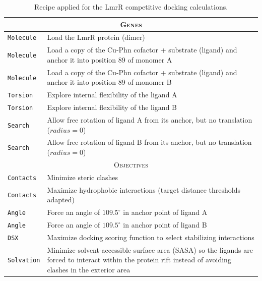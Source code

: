 \begin{table}[hbtp]
	\caption[Recipe applied for the LmrR competitive docking calculations]{Recipe applied for the LmrR competitive docking calculations.}
	\label{table:phn-recipe}
	\footnotesize
	\newcommand{\tableheading}[1]{\multicolumn{2}{c}{\textsc{#1}}}
	\begin{tabularx}{\textwidth}{RL}
		\toprule
		\tableheading{Genes}\\
		\toprule
		\texttt{Molecule} & Load the LmrR protein (dimer) \\
		\midrule
		\texttt{Molecule} & Load a copy of the Cu-Phn cofactor + substrate (ligand) and anchor it into position 89 of monomer A \\
		\midrule
		\texttt{Molecule} & Load a copy of the Cu-Phn cofactor + substrate (ligand) and anchor it into position 89 of monomer B \\
		\midrule
		\texttt{Torsion} & Explore internal flexibility of the ligand A \\
		\midrule
		\texttt{Torsion} & Explore internal flexibility of the ligand B \\
		\midrule
		\texttt{Search} & Allow free rotation of ligand A from its anchor, but no translation ($radius=0$) \\
		\toprule
		\texttt{Search} & Allow free rotation of ligand B from its anchor, but no translation ($radius=0$) \\
		\toprule
		\tableheading{Objectives}\\
		\toprule
		\texttt{Contacts} & Minimize steric clashes \\
		\midrule
		\texttt{Contacts} & Maximize hydrophobic interactions (target distance thresholds adapted) \\
		\midrule
		\texttt{Angle} & Force an angle of $109.5^\circ$ in anchor point of ligand A \\
		\midrule
		\texttt{Angle} & Force an angle of $109.5^\circ$ in anchor point of ligand B \\
		\midrule
		\texttt{DSX} & Maximize docking scoring function to select stabilizing interactions \\
		\midrule
		\texttt{Solvation} & Minimize solvent-accessible surface area (SASA) so the ligands are forced to interact within the protein rift instead of avoiding clashes in the exterior area \\
		\bottomrule
	\end{tabularx}
\end{table}

